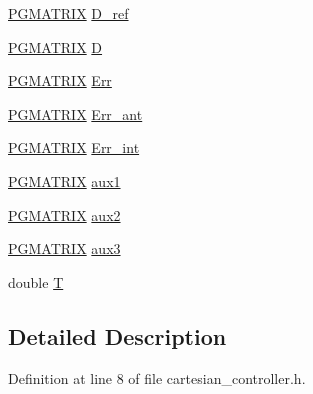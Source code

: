 \begin{DoxyCompactItemize}
\item 
\hyperlink{gmatrix_8h_ad8edc274a17feb9e4fca93e620253bed}{P\-G\-M\-A\-T\-R\-I\-X} \hyperlink{classCartesian__controller_abb248cb3215a574fe8e1bb8fb0b8626d}{D\-\_\-ref}
\item 
\hyperlink{gmatrix_8h_ad8edc274a17feb9e4fca93e620253bed}{P\-G\-M\-A\-T\-R\-I\-X} \hyperlink{classCartesian__controller_a8c470b652ce436d8e48f126073fc2593}{D}
\item 
\hyperlink{gmatrix_8h_ad8edc274a17feb9e4fca93e620253bed}{P\-G\-M\-A\-T\-R\-I\-X} \hyperlink{classCartesian__controller_ab3f08ecf10cb2486e8bfc61f07e2bde6}{Err}
\item 
\hyperlink{gmatrix_8h_ad8edc274a17feb9e4fca93e620253bed}{P\-G\-M\-A\-T\-R\-I\-X} \hyperlink{classCartesian__controller_a6d9471a983f6cb6c642bf8dea0d540af}{Err\-\_\-ant}
\item 
\hyperlink{gmatrix_8h_ad8edc274a17feb9e4fca93e620253bed}{P\-G\-M\-A\-T\-R\-I\-X} \hyperlink{classCartesian__controller_a248174c6399a8933bfcc8f1b0b39af5e}{Err\-\_\-int}
\item 
\hyperlink{gmatrix_8h_ad8edc274a17feb9e4fca93e620253bed}{P\-G\-M\-A\-T\-R\-I\-X} \hyperlink{classCartesian__controller_a37edb9c6e2a5066f74941e3659f68cbc}{aux1}
\item 
\hyperlink{gmatrix_8h_ad8edc274a17feb9e4fca93e620253bed}{P\-G\-M\-A\-T\-R\-I\-X} \hyperlink{classCartesian__controller_af73a0c910cd80ed2f84974b65beba450}{aux2}
\item 
\hyperlink{gmatrix_8h_ad8edc274a17feb9e4fca93e620253bed}{P\-G\-M\-A\-T\-R\-I\-X} \hyperlink{classCartesian__controller_aa37c15fcd53a60ecce106cd9b39d3501}{aux3}
\item 
double \hyperlink{classCartesian__controller_a35c6ddbb9624878f2807ff644a33e832}{T}
\end{DoxyCompactItemize}


\subsection{Detailed Description}


Definition at line 8 of file cartesian\-\_\-controller.\-h.



